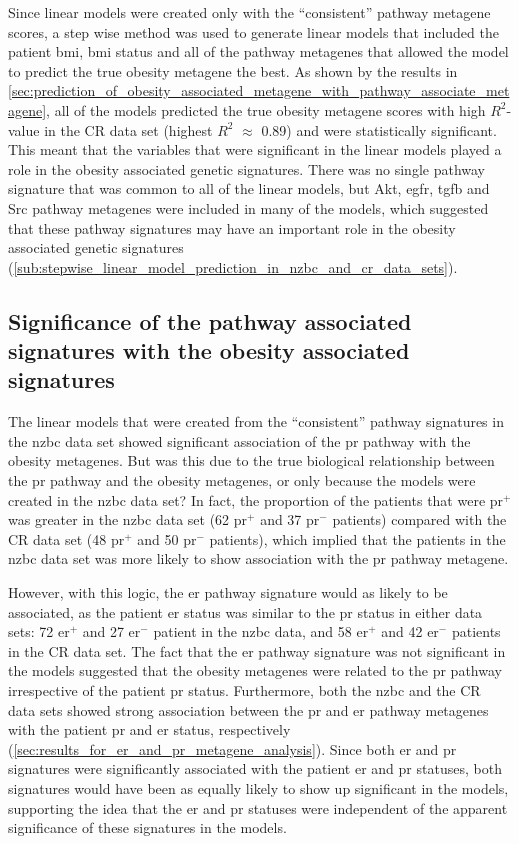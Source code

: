 Since linear models were created only with the ``consistent'' pathway metagene scores, a step wise method was used to generate linear models that included the patient \gls{bmi}, \gls{bmi} status and all of the pathway metagenes that allowed the model to predict the true obesity metagene the best.
As shown by the results in \cref{sec:prediction_of_obesity_associated_metagene_with_pathway_associate_metagene}, all of the models predicted the true obesity metagene scores with high $R^2$-value in the CR data set (highest $R^2$ $\approx$ 0.89) and were statistically significant.
This meant that the variables that were significant in the linear models played a role in the obesity associated genetic signatures.
There was no single pathway signature that was common to all of the linear models, but Akt, \gls{egfr}, \gls{tgfb} and Src pathway metagenes were included in many of the models, which suggested that these pathway signatures may have an important role in the obesity associated genetic signatures (\cref{sub:stepwise_linear_model_prediction_in_nzbc_and_cr_data_sets}).

\subsection{Significance of the pathway associated signatures with the obesity associated signatures}
\label{sub:significance_of_pr_pathway}

The linear models that were created from the ``consistent'' pathway signatures in the \gls{nzbc} data set showed significant association of the \gls{pr} pathway with the obesity metagenes.
But was this due to the true biological relationship between the \gls{pr} pathway and the obesity metagenes, or only because the models were created in the \gls{nzbc} data set?
In fact, the proportion of the patients that were \gls{pr}$^+$ was greater in the \gls{nzbc} data set (62 \gls{pr}$^+$ and 37 \gls{pr}$^-$ patients) compared with the CR data set (48 \gls{pr}$^+$ and 50 \gls{pr}$^-$ patients), which implied that the patients in the \gls{nzbc} data set was more likely to show association with the \gls{pr} pathway metagene.

However, with this logic, the \gls{er} pathway signature would as likely to be associated, as the   patient \gls{er} status was similar to the \gls{pr} status in either data sets: 72 \gls{er}$^+$ and 27 \gls{er}$^-$ patient in the \gls{nzbc} data, and 58 \gls{er}$^+$ and  42 \gls{er}$^-$ patients in the  CR data set.
The fact that the \gls{er} pathway signature was not significant in the models suggested that the obesity metagenes were related to the \gls{pr} pathway irrespective of the patient \gls{pr} status.
Furthermore, both the \gls{nzbc} and the CR data sets showed strong association between the \gls{pr} and \gls{er} pathway metagenes with the patient \gls{pr} and \gls{er} status, respectively (\cref{sec:results_for_er_and_pr_metagene_analysis}).
Since both \gls{er} and \gls{pr} signatures were significantly associated with the patient \gls{er} and \gls{pr} statuses, both signatures would have been as equally likely to show up significant in the models, supporting the idea that the \gls{er} and \gls{pr} statuses were independent of the apparent significance of these signatures in the models.

